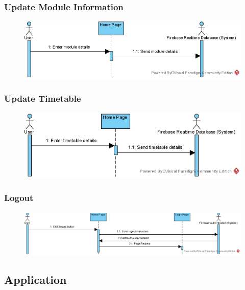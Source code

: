 \documentclass[../report.tex]{subfiles}
\begin{document}
\subsubsection{Update Module Information}
\begin{figure}[H]
\centering
\includegraphics[width=\textwidth]{./images/05/07-web-module.png}
\label{fig:web-module-seq}
\end{figure}

\subsubsection{Update Timetable}
\begin{figure}[H]
\centering
\includegraphics[width=\textwidth]{./images/05/07-web-timetable.png}
\label{fig:web-timetable-seq}
\end{figure}

\subsubsection{Logout}
\begin{figure}[H]
\centering
\includegraphics[width=\textwidth]{./images/05/07-web-logout.png}
\label{fig:web-logout-seq}
\end{figure}

\subsection{Application}
\end{document}
